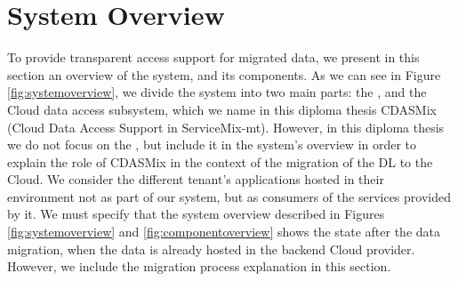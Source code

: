\section{System Overview}
\label{sec:systemoverview}





To provide transparent access support for migrated data, we present in this section an overview of the system, and its components. As we can see in Figure \ref{fig:systemoverview}, we divide the system into two main parts: the , and the Cloud data access subsystem, which we name in this diploma thesis CDASMix (Cloud Data Access Support in ServiceMix-mt). However, in this diploma thesis we do not focus on the , but include it in the system's overview in order to explain the role of CDASMix in the context of the migration of the DL to the Cloud. We consider the different tenant's applications hosted in their environment not as part of our system, but as consumers of the services provided by it. We must specify that the system overview described in Figures \ref{fig:systemoverview} and \ref{fig:componentoverview} shows the state after the data migration, when the data is already hosted in the backend Cloud provider. However, we include the migration process explanation in this section.


